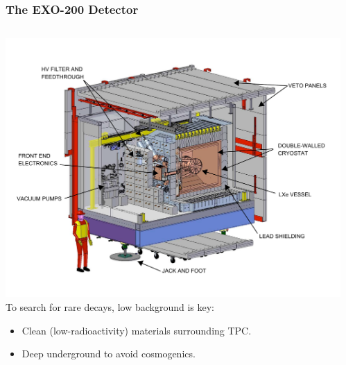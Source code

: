 \documentclass{beamer}
\begin{document}
\begin{frame}
\begin{center}
\frametitle{The EXO-200 Detector}
\end{center}
\begin{columns}[onlytextwidth]
\begin{column}{.5\textwidth}
\includegraphics[keepaspectratio=true,width=\textwidth]{cleanroom.pdf}\\
To search for rare decays, low background is key:
\begin{itemize}
\item Clean (low-radioactivity) materials surrounding TPC.
\item Deep underground to avoid cosmogenics.
\end{itemize}
\end{column}
\begin{column}{.5\textwidth}

\end{column}
\end{columns}
\end{frame}
\end{document}

